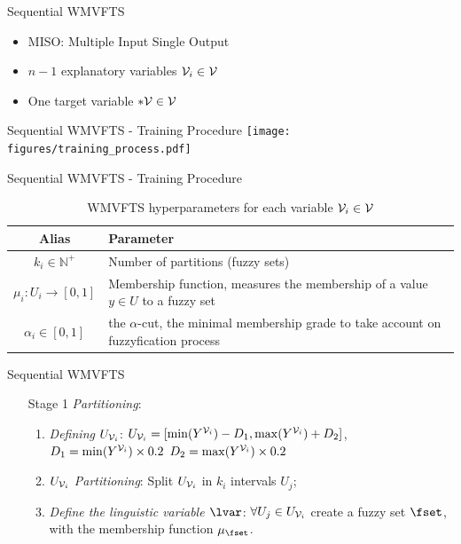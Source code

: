 \documentclass{beamer}
\begin{document}
\begin{frame}{Sequential WMVFTS}
\begin{itemize}
\item MISO: Multiple Input Single Output
\item $n-1$ explanatory variables $\mathcal{V}_i \in \mathcal{V}$
\item One target variable $*\mathcal{V} \in \mathcal{V}$
\end{itemize}
\end{frame}

\begin{frame}{Sequential WMVFTS - Training Procedure}
\centering
\texttt{[image: figures/training\_process.pdf]}
\end{frame}

\begin{frame}{Sequential WMVFTS - Training Procedure}
\begin{table}[]
    \centering
    \begin{tabular}{|c|m{6cm}|} \hline
        \textbf{Alias} & \textbf{Parameter} \\ \hline
         $k_i \in \mathbb{N}^+$ & Number of partitions (fuzzy sets) \\ \hline
         $\mu_i: U_i \rightarrow [0,1] $ & Membership function, measures the membership of a value $y \in U$ to a fuzzy set  \\\hline
         $\alpha_i \in [0,1]$ & the $\alpha$-cut, the minimal membership grade to take account on fuzzyfication process \\ \hline
    \end{tabular}
    \caption{WMVFTS hyperparameters for each variable $\mathcal{V}_i \in \mathcal{V}$}
    \label{tab:hyperparameters}
\end{table}
\end{frame}

\begin{frame}{Sequential WMVFTS }
\linespread{2}
\begin{enumerate}
\item[Stage 1] \textit{Partitioning}:
\begin{enumerate}
\item \textit{Defining $U_{\mathcal{V}_i}$}: $U_{\mathcal{V}_i} = [\min(Y^{\mathcal{V}_i})-D_1, \max(Y^{\mathcal{V}_i})+D_2]$, 
$D_1 = \min(Y^{\mathcal{V}_i})\times 0.2$
$D_2 = \max(Y^{\mathcal{V}_i})\times 0.2$ 

\item \textit{$U_{\mathcal{V}_i}$ Partitioning}: Split $U_{\mathcal{V}_i}$ in $k_i$ intervals $U_j$;

\item \textit{Define the linguistic variable $\lvar$}:  $\forall U_j \in U_{\mathcal{V}_i}$  create a fuzzy set $\fset$, with the membership function $\mu_{\fset}$. 
\end{enumerate}
\end{enumerate}
\end{frame}
\end{document}
